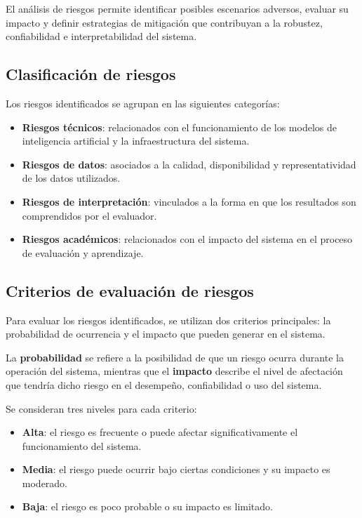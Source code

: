 El análisis de riesgos permite identificar posibles escenarios adversos, evaluar su impacto y definir estrategias de mitigación que contribuyan a la robustez, confiabilidad e interpretabilidad del sistema.

\subsection{Clasificación de riesgos}

Los riesgos identificados se agrupan en las siguientes categorías:

\begin{itemize}
	\item \textbf{Riesgos técnicos}: relacionados con el funcionamiento de los modelos de inteligencia artificial y la infraestructura del sistema.
	\item \textbf{Riesgos de datos}: asociados a la calidad, disponibilidad y representatividad de los datos utilizados.
	\item \textbf{Riesgos de interpretación}: vinculados a la forma en que los resultados son comprendidos por el evaluador.
	\item \textbf{Riesgos académicos}: relacionados con el impacto del sistema en el proceso de evaluación y aprendizaje.
\end{itemize}

\subsection{Criterios de evaluación de riesgos}

Para evaluar los riesgos identificados, se utilizan dos criterios principales: la probabilidad de ocurrencia y el impacto que pueden generar en el sistema.

La \textbf{probabilidad} se refiere a la posibilidad de que un riesgo ocurra durante la operación del sistema, mientras que el \textbf{impacto} describe el nivel de afectación que tendría dicho riesgo en el desempeño, confiabilidad o uso del sistema.

Se consideran tres niveles para cada criterio:

\begin{itemize}
	\item \textbf{Alta}: el riesgo es frecuente o puede afectar significativamente el funcionamiento del sistema.
	\item \textbf{Media}: el riesgo puede ocurrir bajo ciertas condiciones y su impacto es moderado.
	\item \textbf{Baja}: el riesgo es poco probable o su impacto es limitado.
\end{itemize}


